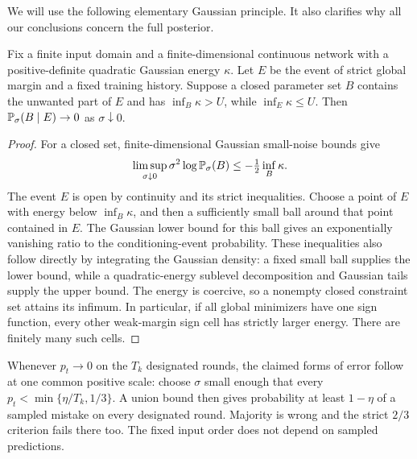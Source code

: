 We will use the following elementary Gaussian principle. It also
clarifies why all our conclusions concern the full posterior.

\begin{lemma}
\label{lem:gaussian}
Fix a finite input domain and a finite-dimensional continuous network
with a positive-definite quadratic Gaussian energy $\kappa$.
Let $E$ be the event of strict global margin and a fixed training history.
Suppose a closed parameter set $B$ contains the unwanted part of $E$ and
has $\inf_B\kappa>U$, while $\inf_E\kappa\le U$.
Then $\mathbb P_\sigma(B\mid E)\to0$ as $\sigma\downarrow0$.
\end{lemma}
\begin{proof}
For a closed set, finite-dimensional Gaussian small-noise bounds give
\[
 \limsup_{\sigma\downarrow0}\sigma^2\log\mathbb P_\sigma(B)
       \le-\tfrac12\inf_B\kappa.
\]
The event $E$ is open by continuity and its strict inequalities.
Choose a point of $E$ with energy below $\inf_B\kappa$, and then a
sufficiently small ball around that point contained in $E$. The
Gaussian lower bound for this ball gives an exponentially vanishing
ratio to the conditioning-event probability. These inequalities also follow directly
by integrating the Gaussian density: a fixed small ball supplies the
lower bound, while a quadratic-energy sublevel decomposition and Gaussian
tails supply the upper bound. The energy is coercive, so a nonempty
closed constraint set attains its infimum. In particular, if all global
minimizers have one sign function, every other weak-margin sign cell has
strictly larger energy. There are finitely many such cells.
\end{proof}

Whenever $p_t\to0$ on the $T_k$ designated rounds, the claimed forms of
error follow at one common positive scale: choose $\sigma$ small enough
that every $p_t<\min\{\eta/T_k,1/3\}$. A union bound then gives
probability at least $1-\eta$ of a sampled mistake on every designated
round. Majority is wrong and the strict $2/3$ criterion fails there too.
The fixed input order does not depend on sampled predictions.
